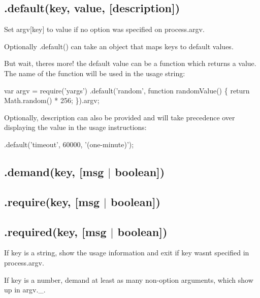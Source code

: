 \subsection*{.default(key, value, \mbox{[}description\mbox{]}) }

Set {\ttfamily argv\mbox{[}key\mbox{]}} to {\ttfamily value} if no option was specified on {\ttfamily process.\+argv}.

Optionally {\ttfamily .default()} can take an object that maps keys to default values.

But wait, there\textquotesingle{}s more! the default value can be a {\ttfamily function} which returns a value. The name of the function will be used in the usage string\+:


\begin{DoxyCode}
var argv = require(\textcolor{stringliteral}{'yargs'})
  .default(\textcolor{stringliteral}{'random'}, \textcolor{keyword}{function} randomValue() \{
    \textcolor{keywordflow}{return} Math.random() * 256;
  \}).argv;
\end{DoxyCode}


Optionally, {\ttfamily description} can also be provided and will take precedence over displaying the value in the usage instructions\+:


\begin{DoxyCode}
.default(\textcolor{stringliteral}{'timeout'}, 60000, \textcolor{stringliteral}{'(one-minute)'});
\end{DoxyCode}


\subsection*{.demand(key, \mbox{[}msg $\vert$ boolean\mbox{]}) }

\subsection*{.require(key, \mbox{[}msg $\vert$ boolean\mbox{]}) }

\subsection*{.required(key, \mbox{[}msg $\vert$ boolean\mbox{]}) }

If {\ttfamily key} is a string, show the usage information and exit if {\ttfamily key} wasn\textquotesingle{}t specified in {\ttfamily process.\+argv}.

If {\ttfamily key} is a number, demand at least as many non-\/option arguments, which show up in {\ttfamily argv.\+\_\+}.

